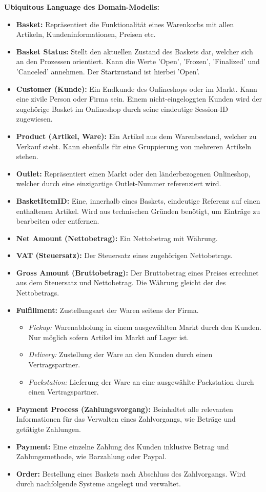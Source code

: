 {\large \textbf{Ubiquitous Language des Domain-Modells:}}
\begin{itemize}[topsep=-3px]
	\item \textbf{Basket: } {Repräsentiert die Funktionalität eines Warenkorbs mit allen Artikeln, Kundeninformationen, Preisen etc.}
	\item \textbf{Basket Status: } {Stellt den aktuellen Zustand des Baskets dar, welcher sich an den Prozessen orientiert. Kann die Werte 'Open', 'Frozen', 'Finalized' und 'Canceled' annehmen. Der Startzustand ist hierbei 'Open'.}
	\item \textbf{Customer (Kunde): } {Ein Endkunde des Onlineshops oder im Markt. Kann eine zivile Person oder Firma sein. Einem nicht-eingeloggten Kunden wird der zugehörige Basket im Onlineshop durch seine eindeutige Session-ID zugewiesen.} 
	\item \textbf{Product (Artikel, Ware): } {Ein Artikel aus dem Warenbestand, welcher zu Verkauf steht. Kann ebenfalls für eine Gruppierung von mehreren Artikeln stehen.}
	\item \textbf{Outlet: } {Repräsentiert einen Markt oder den länderbezogenen Onlineshop, welcher durch eine einzigartige Outlet-Nummer referenziert wird.}
	\item \textbf{BasketItemID: } {Eine, innerhalb eines Baskets, eindeutige Referenz auf einen enthaltenen Artikel. Wird aus technischen Gründen benötigt, um Einträge zu bearbeiten oder entfernen.}
	\item \textbf{Net Amount (Nettobetrag): } {Ein Nettobetrag mit Währung.}
	\item \textbf{VAT (Steuersatz): } {Der Steuersatz eines zugehörigen Nettobetrags.}
	\item \textbf{Gross Amount (Bruttobetrag): } {Der Bruttobetrag eines Preises errechnet aus dem Steuersatz und Nettobetrag. Die Währung gleicht der des Nettobetrags.}
	\item \textbf{Fulfillment: } {Zustellungsart der Waren seitens der Firma.}
	\begin{itemize}[noitemsep,nolistsep, topsep=-5px]
		\item \textit{Pickup: } {Warenabholung in einem ausgewählten Markt durch den Kunden. Nur möglich sofern Artikel im Markt auf Lager ist.}
		\item \textit{Delivery: } {Zustellung der Ware an den Kunden durch einen Vertragspartner.}
		\item \textit{Packstation: } {Lieferung der Ware an eine ausgewählte Packstation durch einen Vertragspartner.}
	\end{itemize}
	\item \textbf{Payment Process (Zahlungsvorgang): } {Beinhaltet alle relevanten Informationen für das Verwalten eines Zahlvorgangs, wie Beträge und getätigte Zahlungen.}
	\item \textbf{Payment: } {Eine einzelne Zahlung des Kunden inklusive Betrag und Zahlungsmethode, wie Barzahlung oder Paypal.}
	\item \textbf{Order: } {Bestellung eines Baskets nach Abschluss des Zahlvorgangs. Wird durch nachfolgende Systeme angelegt und verwaltet.}
\end{itemize}

